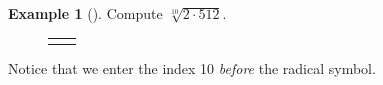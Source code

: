 \documentclass[10pt,]{book}
\theoremstyle{plain}
\theoremstyle{definition}
\theoremstyle{definition}
\newtheorem{example}[theorem]{Example}
\theoremstyle{definition}
\numberwithin{equation}{part}
\newlength{\panelmax}
\begin{document}
\begin{example}[]\label{example-107}
Compute \(\sqrt[10]{2\cdot 512} \).%
{%
\setlength{\panelmax}{0pt}
\newsavebox{\panelboxAJJp}
\newlength{\phAJJp}\setlength{\phAJJp}{\ht\panelboxAJJp+\dp\panelboxAJJp}
\settototalheight{\phAJJp}{\usebox{\panelboxAJJp}}
\setlength{\panelmax}{\maxof{\panelmax}{\phAJJp}}
\newsavebox{\panelboxAJKp}
\newlength{\phAJKp}\setlength{\phAJKp}{\ht\panelboxAJKp+\dp\panelboxAJKp}
\settototalheight{\phAJKp}{\usebox{\panelboxAJKp}}
\setlength{\panelmax}{\maxof{\panelmax}{\phAJKp}}
\leavevmode%
\setlength{\tabcolsep}{0.025\textwidth}
\begin{figure}
\begin{tabular}{@{}*{2}{c}@{}}
\begin{minipage}[c][\panelmax][t]{0.6\textwidth}\usebox{\panelboxAJJp}\end{minipage}&
\begin{minipage}[c][\panelmax][t]{0.35\textwidth}\usebox{\panelboxAJKp}\end{minipage}\end{tabular}
\end{figure}
}%
\end{example}
\par
Notice that we enter the index 10 \emph{before} the radical symbol.%
\typeout{************************************************}
\typeout{************************************************}
\end{document}
